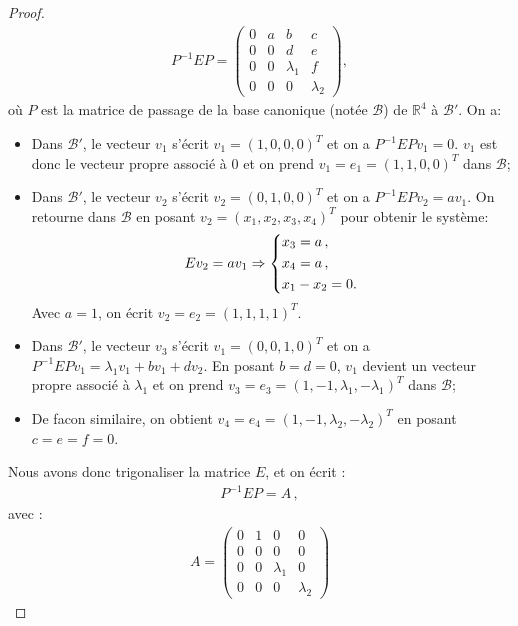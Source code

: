 \begin{proof}
\begin{align}
    P^{-1}EP = \begin{pmatrix}
        0 & a & b & c \\ 0 & 0 & d & e \\ 0 & 0 & \lambda_1 & f \\ 0 & 0 & 0 & \lambda_2
    \end{pmatrix},
\end{align}
où $P$ est la matrice de passage de la base canonique (notée $\mathcal{B}$) de $\mathbb{R}^4$ à $\mathcal{B}'$. On a:
\begin{itemize}
    \item Dans $\mathcal{B}'$, le vecteur $v_1$ s'écrit $v_1 = (1,0,0,0)^T$ et on a $P^{-1}EP v_1 = 0$. $v_1$ est donc le vecteur propre associé à $0$ et on prend $v_1 = e_1 = (1,1,0,0)^T$ dans $\mathcal{B}$;
    \item Dans $\mathcal{B}'$, le vecteur $v_2$ s'écrit $v_2 = (0,1,0,0)^T$ et on a $P^{-1}EP v_2 = a v_1$. On retourne dans $\mathcal{B}$ en posant $v_2 = (x_1, x_2, x_3, x_4)^T$ pour obtenir le système:
    \begin{align*}
        E v_2 = a v_1 \Rightarrow
        \begin{dcases}            
        x_3 = a \,,  \\
        x_4 = a  \,, \\
        x_1 - x_2 = 0.
        \end{dcases}
    \end{align*} 
    Avec $a = 1$, on écrit $v_2 = e_2 = (1,1,1,1)^T$.
    \item Dans $\mathcal{B}'$, le vecteur $v_3$ s'écrit $v_1 = (0,0,1,0)^T$ et on a $P^{-1}EP v_1 = \lambda_1 v_1 + bv_1 + d v_2$. En posant $b=d=0$, $v_1$ devient un vecteur propre associé à $\lambda_1$ et on prend $v_3 = e_3 = (1,-1,\lambda_1,-\lambda_1)^T$ dans $\mathcal{B}$;
    \item De facon similaire, on obtient $v_4 = e_4 = (1,-1,\lambda_2,-\lambda_2)^T$ en posant $c=e=f=0$.
\end{itemize}
Nous avons donc trigonaliser la matrice $E$, et on écrit :
\begin{align}
    P^{-1}EP = A \,,
\end{align}
avec :
\begin{align*}
    A = \begin{pmatrix}
        0 & 1 & 0 & 0 \\ 0 & 0 & 0 & 0 \\ 0 & 0 & \lambda_1 & 0 \\ 0 & 0 & 0 & \lambda_2

\end{pmatrix}
\end{align*}
\end{proof}
